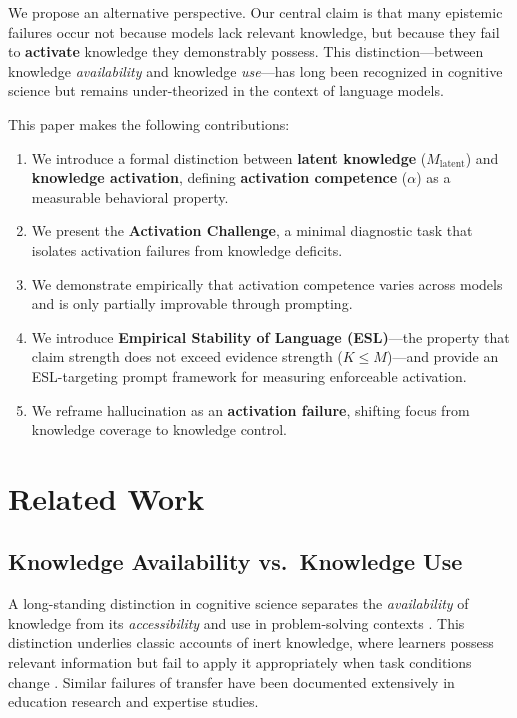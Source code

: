 \documentclass[11pt,a4paper]{article}
\begin{document}
We propose an alternative perspective. Our central claim is that many epistemic failures occur not because models lack relevant knowledge, but because they fail to \textbf{activate} knowledge they demonstrably possess. This distinction---between knowledge \emph{availability} and knowledge \emph{use}---has long been recognized in cognitive science \citep{tulving1966availability, whitehead1929aims} but remains under-theorized in the context of language models.

This paper makes the following contributions:
\begin{enumerate}
    \item We introduce a formal distinction between \textbf{latent knowledge} ($M_{\text{latent}}$) and \textbf{knowledge activation}, defining \textbf{activation competence} ($\alpha$) as a measurable behavioral property.
    \item We present the \textbf{Activation Challenge}, a minimal diagnostic task that isolates activation failures from knowledge deficits.
    \item We demonstrate empirically that activation competence varies across models and is only partially improvable through prompting.
    \item We introduce \textbf{Empirical Stability of Language (ESL)}---the property that claim strength does not exceed evidence strength ($K \le M$)---and provide an ESL-targeting prompt framework for measuring enforceable activation.
    \item We reframe hallucination as an \textbf{activation failure}, shifting focus from knowledge coverage to knowledge control.
\end{enumerate}


\section{Related Work}

\subsection{Knowledge Availability vs.\ Knowledge Use}

A long-standing distinction in cognitive science separates the \emph{availability} of knowledge from its \emph{accessibility} and use in problem-solving contexts \citep{tulving1966availability}. This distinction underlies classic accounts of inert knowledge, where learners possess relevant information but fail to apply it appropriately when task conditions change \citep{whitehead1929aims}. Similar failures of transfer have been documented extensively in education research and expertise studies.
\end{document}
